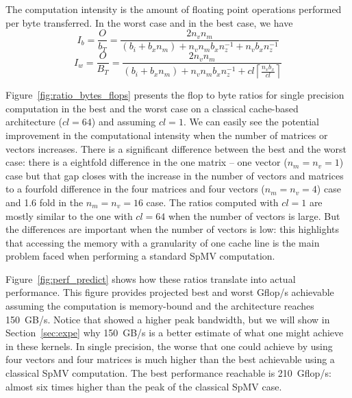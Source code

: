 \documentclass{sig-alternate}
\newcommand{\ceil}[1]{\left\lceil#1\right\rceil}
\begin{document}
The computation intensity is the amount of floating point operations performed per
byte transferred. In the worst case and in the best case, we have
$$I_b = \frac{O}{b_T} = \frac{2 n_v n_m}{ (b_i + b_x n_m) + n_v n_m b_x n_z^{-1} + n_v b_x n_z^{-1} }$$
$$I_w = \frac{O}{B_T} = \frac{2 n_v n_m}{(b_i+b_x n_m) + n_v n_m b_x n_z^{-1} + cl \ceil{\frac{n_vb_x}{cl}} }$$


Figure~\ref{fig:ratio_bytes_flops} presents the flop to byte ratios
for single precision computation in the best and the worst case on a
classical cache-based architecture ($cl = 64$) and assuming $cl=1$. We
can easily see the potential improvement in the computational
intensity when the number of matrices or vectors increases. There is a
significant difference between the best and the worst case: there is a
eightfold difference in the one matrix -- one vector ($n_m=n_v=1$) case but that gap closes
with the increase in the number of vectors and matrices to a fourfold
difference in the four matrices and four vectors ($n_m=n_v=4$) case and 1.6 fold in the 
$n_m=n_v=16$ case. 
The ratios computed with $cl = 1$ are mostly
similar to the one with $cl=64$ when the number of vectors is
large. But the differences are important when the number of vectors is
low: this highlights that accessing the memory with a granularity of one cache
line is the main problem faced when performing a standard SpMV computation.

Figure~\ref{fig:perf_predict} shows how these ratios translate
into actual performance. This figure provides projected best and worst
Gflop/s achievable assuming the computation is memory-bound and the
architecture reaches 150~GB/s. Notice that \cite{Saule13-ARXIV}
showed a higher peak bandwidth, but we will show in
Section~\ref{sec:expe} why 150~GB/s is a better estimate of what one
might achieve in these kernels. In single precision, the worse that
one could achieve by using four vectors and four matrices is much higher
than the best achievable using a classical SpMV computation. The best
performance reachable is 210~Gflop/s: almost six times higher than the
peak of the classical SpMV case. 
\end{document}

